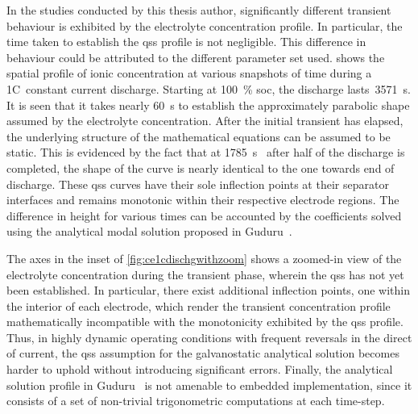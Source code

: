 In  the  studies  conducted  by  this  thesis  author,  significantly  different
transient  behaviour  is exhibited  by  the  electrolyte concentration  profile.
In  particular,  the time  taken  to  establish  the  \gls{qss} profile  is  not
negligible. This  difference in behaviour  could be attributed to  the different
parameter  set used.    shows  the spatial  profile
of  ionic  concentration at  various  snapshots  of  time during  a  1C~constant
current  discharge.  Starting  at \SI{100}{\percent}  \gls{soc},  the  discharge
lasts~\SI{3571}{\second}.  It  is seen  that  it  takes nearly  \SI{60}{\second}
to  establish  the approximately  parabolic  shape  assumed by  the  electrolyte
concentration. After the initial transient has elapsed, the underlying structure
of the mathematical equations can be assumed  to be static. This is evidenced by
the  fact  that  at  \SI{1785}{\second}  \ie~after  half  of  the  discharge  is
completed, the shape of the curve is  nearly identical to the one towards end of
discharge. These  \gls{qss} curves  have their sole  inflection points  at their
separator  interfaces and  remains monotonic  within their  respective electrode
regions.  The  difference in  height  for  various  times  can be  accounted  by
the  coefficients  solved  using  the  analytical  modal  solution  proposed  in
Guduru~\etal{}.

The  axes  in  the  inset of  \cref{fig:ce1cdischgwithzoom}  shows  a  zoomed-in
view  of  the electrolyte  concentration  during  the transient  phase,  wherein
the  \gls{qss}  has  not  yet  been  established.  In  particular,  there  exist
additional inflection points,  one within the interior of  each electrode, which
render the transient concentration  profile mathematically incompatible with the
monotonicity  exhibited  by  the  \gls{qss} profile.  Thus,  in  highly  dynamic
operating  conditions with  frequent reversals  in  the direct  of current,  the
\gls{qss} assumption for the galvanostatic analytical solution becomes harder to
uphold without introducing significant  errors. Finally, the analytical solution
profile in Guduru~\etal{}  is not amenable to embedded  implementation, since it
consists of a set of non-trivial trigonometric computations at each time-step.

